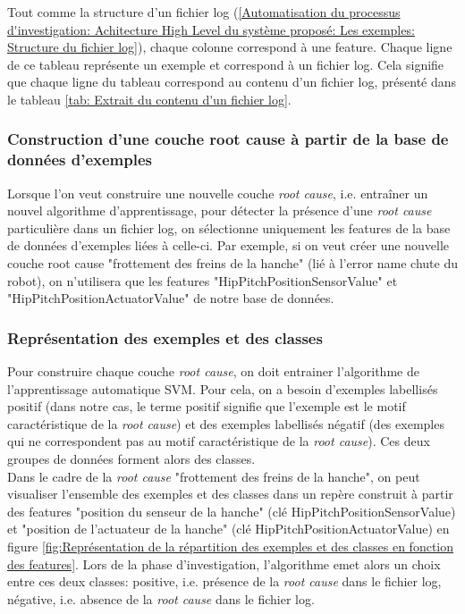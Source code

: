 Tout comme la structure d'un fichier log (\ref{Automatisation du processus d'investigation: Achitecture High Level du système proposé: Les exemples: Structure du fichier log}), chaque colonne correspond à une feature. Chaque ligne de ce tableau représente un exemple et correspond à un fichier log. Cela signifie que chaque ligne du tableau correspond au contenu d'un fichier log, présenté dans le tableau \ref {tab: Extrait du contenu d'un fichier log}.

\subsubsection{Construction d'une couche root cause à partir de la base de données d'exemples}
\label{Automatisation du processus d'investigation: Achitecture High Level du système proposé: Les exemples: Construction d'une couche root cause à partir de la base de données d'exemples}
Lorsque l'on veut construire une nouvelle couche \emph{root cause}, i.e. entraîner un nouvel algorithme d'apprentissage, pour détecter la présence d'une \emph{root cause} particulière dans un fichier log, on sélectionne uniquement les features de la base de données d'exemples liées à celle-ci. Par exemple, si on veut créer une nouvelle couche root cause "frottement des freins de la hanche" (lié à l'error name chute du robot), on n'utilisera que les features "HipPitchPositionSensorValue" et "HipPitchPositionActuatorValue" de notre base de données.

\subsubsection{Représentation des exemples et des classes}
\label{Automatisation du processus d'investigation: Achitecture High Level du système proposé: Les exemples: Représentation des exemples et des classes}
Pour construire chaque couche \emph{root cause}, on doit entrainer l'algorithme de l'apprentissage automatique SVM. Pour cela, on a besoin d'exemples labellisés positif (dans notre cas, le terme positif signifie que l'exemple est le motif caractéristique de la \emph{root cause}) et des exemples labellisés négatif (des exemples qui ne correspondent pas au motif caractéristique de la \emph{root cause}). Ces deux groupes de données forment alors des classes. \\
Dans le cadre de la \emph{root cause} "frottement des freins de la hanche", on peut visualiser l'ensemble des exemples et des classes dans un repère construit à partir des features "position du senseur de la hanche" (clé HipPitchPositionSensorValue) et "position de l'actuateur de la hanche" (clé HipPitchPositionActuatorValue) en figure \ref{fig:Représentation de la répartition des exemples et des classes en fonction des features}. Lors de la phase d'investigation, l'algorithme emet alors un choix entre ces deux classes: positive, i.e. présence de la \emph{root cause} dans le fichier log, négative, i.e. absence de la \emph{root cause} dans le fichier log. 

